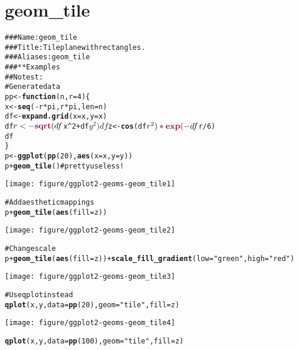 \documentclass[a4paper,titlepage]{tufte-handout}\usepackage{graphicx, color}
\makeatletter
\def\maxwidth{ %
  \ifdim\Gin@nat@width>\linewidth
    \linewidth
  \else
    \Gin@nat@width
  \fi
}
\newcommand{\hlfunctioncall}[1]{\textcolor[rgb]{0.501960784313725,0,0.329411764705882}{\textbf{#1}}}%
\newcommand{\hlstring}[1]{\textcolor[rgb]{0.6,0.6,1}{#1}}%
\newcommand{\hlcomment}[1]{\textcolor[rgb]{0.180392156862745,0.6,0.341176470588235}{#1}}%
\newenvironment{kframe}{%
 \def\at@end@of@kframe{}%
 \ifinner\ifhmode%
  \def\at@end@of@kframe{\end{minipage}}%
  \begin{minipage}{\columnwidth}%
 \fi\fi%
 \def\FrameCommand##1{\hskip\@totalleftmargin \hskip-\fboxsep
 \colorbox{shadecolor}{##1}\hskip-\fboxsep
     \hskip-\linewidth \hskip-\@totalleftmargin \hskip\columnwidth}%
 \MakeFramed {\advance\hsize-\width
   \@totalleftmargin\z@ \linewidth\hsize
   \@setminipage}}%
 {\par\unskip\endMakeFramed%
 \at@end@of@kframe}
\newenvironment{knitrout}{}{} %
\makeatother
\begin{document}
\section{geom\_tile}

\begin{knitrout}
\color{fgcolor}\begin{kframe}
\begin{alltt}
\hlcomment{### Name: geom_tile}
\hlcomment{### Title: Tile plane with rectangles.}
\hlcomment{### Aliases: geom_tile}
\hlcomment{### ** Examples}
\hlcomment{## No test: }
\hlcomment{# Generate data}
pp <- \hlfunctioncall{function} (n,r=4) \{
 x <- \hlfunctioncall{seq}(-r*pi, r*pi, len=n)
 df <- \hlfunctioncall{expand.grid}(x=x, y=x)
 df$r <- \hlfunctioncall{sqrt}(df$x^2 + df$y^2)
 df$z <- \hlfunctioncall{cos}(df$r^2)*\hlfunctioncall{exp}(-df$r/6)
 df
\}
p <- \hlfunctioncall{ggplot}(\hlfunctioncall{pp}(20), \hlfunctioncall{aes}(x=x,y=y))
p + \hlfunctioncall{geom_tile}() \hlcomment{#pretty useless!}
\end{alltt}
\end{kframe}\texttt{[image: figure/ggplot2-geoms-geom\_tile1]} \begin{kframe}\begin{alltt}
\hlcomment{# Add aesthetic mappings}
p + \hlfunctioncall{geom_tile}(\hlfunctioncall{aes}(fill=z))
\end{alltt}
\end{kframe}\texttt{[image: figure/ggplot2-geoms-geom\_tile2]} \begin{kframe}\begin{alltt}
\hlcomment{# Change scale}
p + \hlfunctioncall{geom_tile}(\hlfunctioncall{aes}(fill=z)) + \hlfunctioncall{scale_fill_gradient}(low=\hlstring{"green"}, high=\hlstring{"red"})
\end{alltt}
\end{kframe}\texttt{[image: figure/ggplot2-geoms-geom\_tile3]} \begin{kframe}\begin{alltt}
\hlcomment{# Use qplot instead}
\hlfunctioncall{qplot}(x, y, data=\hlfunctioncall{pp}(20), geom=\hlstring{"tile"}, fill=z)
\end{alltt}
\end{kframe}\texttt{[image: figure/ggplot2-geoms-geom\_tile4]} \begin{kframe}\begin{alltt}
\hlfunctioncall{qplot}(x, y, data=\hlfunctioncall{pp}(100), geom=\hlstring{"tile"}, fill=z)

\end{alltt}
\end{kframe}
\end{knitrout}
\end{document}
